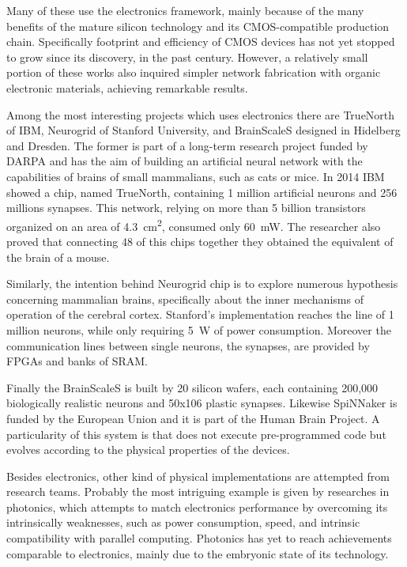 Many of these use the electronics framework, mainly because of the many benefits of the mature silicon technology and its CMOS-compatible production chain.
Specifically footprint and efficiency of CMOS devices has not yet stopped to grow since its discovery, in the past century.
However, a relatively small portion of these works also inquired simpler network fabrication with organic electronic materials, achieving remarkable results.

Among the most interesting projects which uses electronics there are TrueNorth of IBM, Neurogrid of Stanford University, and BrainScaleS designed in Hidelberg and Dresden.
The former is part of a long-term research project funded by DARPA and has the aim of building an artificial neural network with the capabilities of brains of small mammalians, such as cats or mice.
In 2014 IBM showed a chip, named TrueNorth, containing 1 million artificial neurons and 256 millions synapses.
This network, relying on more than 5 billion transistors organized on an area of \SI{4.3}{\square\cm}, consumed only \SI{60}{\mW}.
The researcher also proved that connecting 48 of this chips together they obtained the equivalent of the brain of a mouse.

Similarly, the intention behind Neurogrid chip is to explore numerous hypothesis concerning mammalian brains, specifically about the inner mechanisms of operation of the cerebral cortex.
Stanford's implementation reaches the line of 1 million neurons, while only requiring \SI{5}{\W} of power consumption.
Moreover the communication lines between single neurons, the synapses, are provided by FPGAs and banks of SRAM.

Finally the BrainScaleS is built by 20 silicon wafers, each containing  200,000 biologically realistic neurons and 50x106 plastic synapses.
Likewise SpiNNaker is funded by the European Union and it is part of the Human Brain Project.
A particularity of this system is that does not execute pre-programmed code but evolves according to the physical properties of the devices.\cite{HBP.eu}

Besides electronics, other kind of physical implementations are attempted from research teams.
Probably the most intriguing example is given by researches in photonics, which attempts to match electronics performance by overcoming its intrinsically weaknesses, such as power consumption, speed, and intrinsic compatibility with parallel computing.
Photonics has yet to reach achievements comparable to electronics, mainly due to the embryonic state of its technology.

